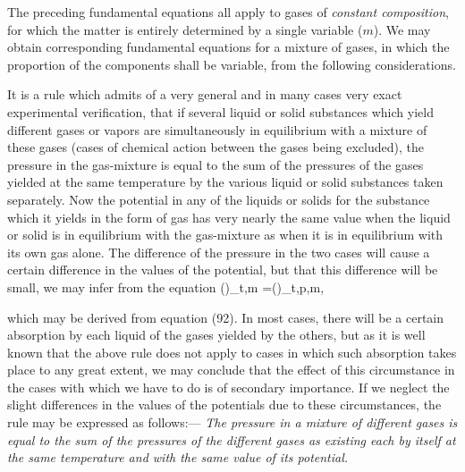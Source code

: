 \documentclass[12pt]{article}
\begin{document}
\par The preceding fundamental equations all apply to gases of \textit{constant composition}, for which the matter is entirely determined by a single variable ($m$). We may obtain corresponding fundamental equations for a mixture of gases, in which the proportion of the components shall be variable, from  the following considerations.


It is a rule which admits of a very general and in many cases very exact experimental verification, that if several liquid or solid substances which yield different gases or vapors are simultaneously in equilibrium with a mixture of these gases (cases of chemical action between the gases being excluded), the pressure in the gas-mixture is equal to the sum of the pressures of the gases yielded at the same temperature by the various liquid or solid substances taken separately. Now the potential in any of the liquids or solids for the substance which it yields in the form of gas has very nearly the same value when the liquid or solid is in equilibrium with the gas-mixture as when it is in equilibrium with its own gas alone. The difference of the pressure in the two cases will cause a certain difference in the values of the potential, but that this difference will be small, we may infer from the equation
\eqs 
\left(\right)_{t,m} =\left(\right)_{t,p,m},       \label{272}\eqe

which may be derived from equation (92). In most cases, there will be a certain absorption by each liquid of the gases yielded by the others, but as it is well known that the above rule does not apply to cases in which such absorption takes place to any great extent, we may conclude that the effect of this circumstance in the cases with which we have to do is of secondary importance. If we neglect the slight differences in the values of the potentials due to these circumstances, the rule may be expressed as follows:---
\textit{The pressure in a mixture of different gases is equal to the sum of the pressures of the different gases as existing each by itself at the same temperature and with the same value of its potential.}
\end{document}
